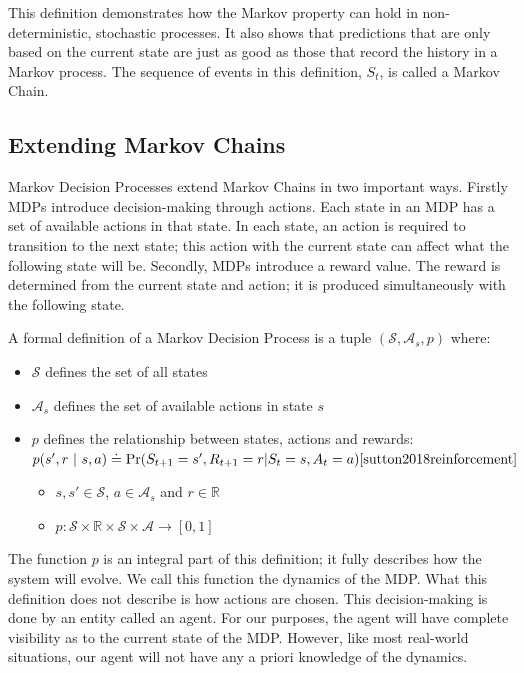 \documentclass[]{final_report}
\begin{document}
This definition demonstrates how the Markov property can hold in non-deterministic, stochastic processes. It also shows that predictions that are only based on the current state are just as good as those that record the history in a Markov process. The sequence of events in this definition, $S_t$, is called a Markov Chain\cite{meyn2012markov}.

\subsection{Extending Markov Chains}

Markov Decision Processes extend Markov Chains in two important ways. Firstly MDPs introduce decision-making through actions. Each state in an MDP has a set of available actions in that state. In each state, an action is required to transition to the next state; this action with the current state can affect what the following state will be. Secondly, MDPs introduce a reward value. The reward is determined from the current state and action; it is produced simultaneously with the following state.

A formal definition of a Markov Decision Process is a tuple $(\mathcal{S},\mathcal{A}_s,p)$ where:
\begin{itemize}
  \item $\mathcal{S}$ defines the set of all states
  \item $\mathcal{A}_s$ defines the set of available actions in state $s$
  \item $p$ defines the relationship between states, actions and rewards: \\
        $p(s',r\ |\ s,a) \doteq \Pr(S_{t+1} = s', R_{t+1} = r | S_t = s, A_t = a)\cite{sutton2018reinforcement}$
        \begin{itemize}
          \item $s, s' \in \mathcal{S}$, $a \in \mathcal{A}_s$ and $r \in \mathbb{R}$
          \item $p: \mathcal{S} \times \mathbb{R} \times \mathcal{S} \times \mathcal{A} \rightarrow [0,1]$
        \end{itemize}
\end{itemize}

The function $p$ is an integral part of this definition; it fully describes how the system will evolve. We call this function the dynamics of the MDP. What this definition does not describe is how actions are chosen. This decision-making is done by an entity called an agent. For our purposes, the agent will have complete visibility as to the current state of the MDP. However, like most real-world situations, our agent will not have any a priori knowledge of the dynamics. 
\end{document}
